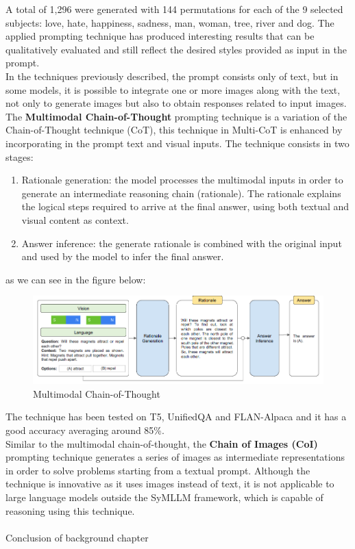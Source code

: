 A total of 1,296 were generated with 144 permutations for each of the 9 selected subjects: love, hate, happiness, sadness, man, woman, tree, river and dog. The applied prompting technique has produced interesting results that can be qualitatively evaluated and still reflect the desired styles provided as input in the prompt.\\
In the techniques previously described, the prompt consists only of text, but in some models, it is possible to integrate one or more images along with the text, not only to generate images but also to obtain responses related to input images. The \textbf{Multimodal Chain-of-Thought} prompting technique\cite{zhang2023multimodal} is a variation of the Chain-of-Thought technique (CoT), this technique in Multi-CoT is enhanced by incorporating in the prompt text and visual inputs. The technique consists in two stages:
\begin{enumerate}
    \item Rationale generation: the model processes the multimodal inputs in order to generate an intermediate reasoning chain (rationale). The rationale explains the logical steps required to arrive at the final answer, using both textual and visual content as context.

    \item Answer inference: the generate rationale is combined with the original input and used by the model to infer the final answer.
\end{enumerate}
as we can see in the figure below:
\begin{figure}[H]
    \centering
    \includegraphics[width=0.9\linewidth]{Figures/fig_16.png}
    \caption{Multimodal Chain-of-Thought}
    \label{fig:enter-label}
\end{figure}
The technique has been tested on T5, UnifiedQA and FLAN-Alpaca and it has a good accuracy averaging around 85\%.\\
Similar to the multimodal chain-of-thought, the \textbf{Chain of Images (CoI)} prompting technique \cite{meng2023chain} generates a series of images as intermediate representations in order to solve problems starting from a textual prompt. Although the technique is innovative as it uses images instead of text, it is not applicable to large language models outside the SyMLLM framework, which is capable of reasoning using this technique. \\\\

Conclusion of background chapter